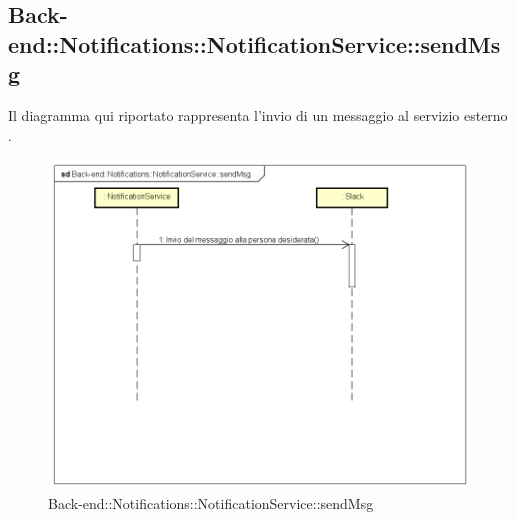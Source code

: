 \subsection{Back-end::Notifications::NotificationService::sendMsg}
Il diagramma qui riportato rappresenta l'invio di un messaggio al servizio esterno .
 \begin{figure}[h] \centering \includegraphics[width=\textwidth,height=\textheight,keepaspectratio]{images/diagrams/back-end/Ufficial_Backend/Back-endNotificationsNotificationServicesendMsg.png} 	\caption{Back-end::Notifications::NotificationService::sendMsg}
\end{figure}

\newpage


